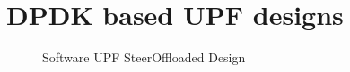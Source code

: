
\section{DPDK based UPF designs \label{sec:UPFSoftDesigns}}
\begin{figure}[htbp]
	\centering

	\caption{ Software UPF   SteerOffloaded Design}
	\label{figure:DesignAB}
\end{figure}

